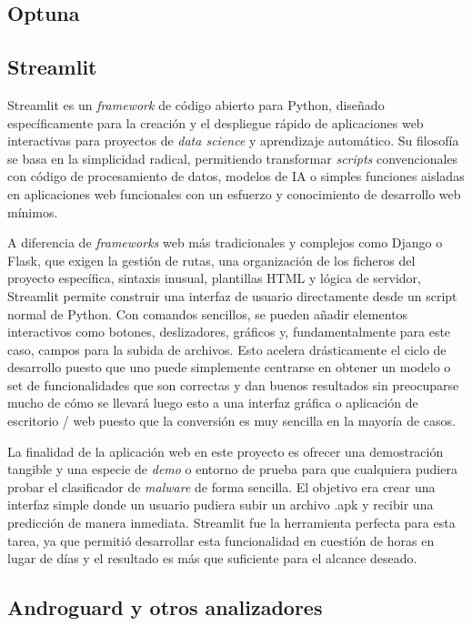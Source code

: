 \subsection{Optuna}

\subsection{Streamlit}

Streamlit es un \textit{framework} de código abierto para Python, diseñado específicamente para la creación y el despliegue rápido de aplicaciones web interactivas para proyectos de \textit{data science} y aprendizaje automático. Su filosofía se basa en la simplicidad radical, permitiendo transformar \textit{scripts} convencionales con código de procesamiento de datos, modelos de IA o simples funciones aisladas en aplicaciones web funcionales con un esfuerzo y conocimiento de desarrollo web mínimos.

A diferencia de \textit{frameworks} web más tradicionales y complejos como Django o Flask, que exigen la gestión de rutas, una organización de los ficheros del proyecto específica, sintaxis inusual, plantillas HTML y lógica de servidor, Streamlit permite construir una interfaz de usuario directamente desde un script normal de Python. Con comandos sencillos, se pueden añadir elementos interactivos como botones, deslizadores, gráficos y, fundamentalmente para este caso, campos para la subida de archivos. Esto acelera drásticamente el ciclo de desarrollo puesto que uno puede simplemente centrarse en obtener un modelo o set de funcionalidades que son correctas y dan buenos resultados sin preocuparse mucho de cómo se llevará luego esto a una interfaz gráfica o aplicación de escritorio / web puesto que la conversión es muy sencilla en la mayoría de casos.

La finalidad de la aplicación web en este proyecto es ofrecer una demostración tangible y una especie de \textit{demo} o entorno de prueba para que cualquiera pudiera probar el clasificador de \textit{malware} de forma sencilla. El objetivo era crear una interfaz simple donde un usuario pudiera subir un archivo .apk y recibir una predicción de manera inmediata. Streamlit fue la herramienta perfecta para esta tarea, ya que permitió desarrollar esta funcionalidad en cuestión de horas en lugar de días y el resultado es más que suficiente para el alcance deseado.

\subsection{Androguard y otros analizadores}

